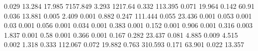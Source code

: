 0.029      13.284     %
17.985     7157.849   %
3.293      1217.64    %
0.332      113.395    %
0.071      19.964     %
0.142      60.91      %
0.036      13.881     %
0.005      2.409      %
0.001      0.882      %
0.247      111.444    %
0.055      23.436     %
0.001      0.053      %
0.001      0.03       %
0.001      0.056      %
0.001      0.034      %
0.001      0.383      %
0.001      0.152      %
0.001      0.906      %
0.001      0.316      %
0.003      1.837      %
0.001      0.58       %
0.001      0.366      %
0.001      0.167      %
0.282      23.437     %
0.081      4.885      %
0.009      4.515      %
0.002      1.318      %
0.333      112.067    %
0.072      19.882     %
0.763      310.593    %
0.171      63.901     %
0.022      13.357     %

